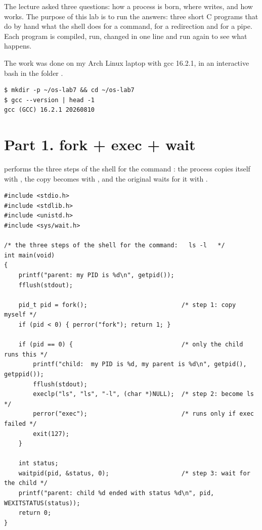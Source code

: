 \documentclass[11pt,a4paper]{article}
\begin{document}
\utmtitlepage
\tableofcontents
\newpage


The lecture asked three questions: how a process is born, where  writes, and how
 works. The purpose of this lab is to run the answers: three short C programs
that do by hand what the shell does for a command, for a redirection and for a pipe. Each
program is compiled, run, changed in one line and run again to see what happens.

The work was done on my Arch Linux laptop with gcc 16.2.1, in an interactive bash in the folder
.

\begin{lstlisting}
$ mkdir -p ~/os-lab7 && cd ~/os-lab7
$ gcc --version | head -1
gcc (GCC) 16.2.1 20260810
\end{lstlisting}

\section{Part 1. fork + exec + wait}

 performs the three steps of the shell for the command : the process
copies itself with , the copy becomes  with , and the original
waits for it with .

\begin{lstlisting}[style=ccode,caption={run.c}]
#include <stdio.h>
#include <stdlib.h>
#include <unistd.h>
#include <sys/wait.h>

/* the three steps of the shell for the command:   ls -l   */
int main(void)
{
    printf("parent: my PID is %d\n", getpid());
    fflush(stdout);

    pid_t pid = fork();                          /* step 1: copy myself */
    if (pid < 0) { perror("fork"); return 1; }

    if (pid == 0) {                              /* only the child runs this */
        printf("child:  my PID is %d, my parent is %d\n", getpid(), getppid());
        fflush(stdout);
        execlp("ls", "ls", "-l", (char *)NULL);  /* step 2: become ls */
        perror("exec");                          /* runs only if exec failed */
        exit(127);
    }

    int status;
    waitpid(pid, &status, 0);                    /* step 3: wait for the child */
    printf("parent: child %d ended with status %d\n", pid, WEXITSTATUS(status));
    return 0;
}
\end{lstlisting}
\end{document}
